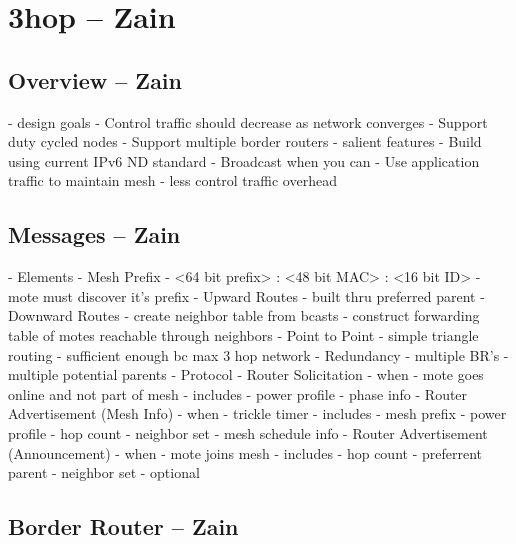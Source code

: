 \section{3hop -- Zain}
\subsection{Overview -- Zain}

- design goals
	- Control traffic should decrease as network converges
	- Support duty cycled nodes
	- Support multiple border routers
- salient features
	- Build using current IPv6 ND standard
	- Broadcast when you can
	- Use application traffic to maintain mesh
	- less control traffic overhead
\subsection{Messages -- Zain}
- Elements
	- Mesh Prefix
		- <64 bit prefix> : <48 bit MAC> : <16 bit ID>
		- mote must discover it's prefix
	- Upward Routes
		- built thru preferred parent
	- Downward Routes
		- create neighbor table from bcasts
		- construct forwarding table of motes reachable through neighbors
	- Point to Point
		- simple triangle routing
		- sufficient enough bc max 3 hop network
	- Redundancy
		- multiple BR's
		- multiple potential parents
- Protocol
	- Router Solicitation
		- when
			- mote goes online and not part of mesh
		- includes
			- power profile
			- phase info
	- Router Advertisement (Mesh Info)
		- when
			- trickle timer
		- includes
			- mesh prefix
			- power profile
			- hop count
			- neighbor set
			- mesh schedule info
	- Router Advertisement (Announcement)
		- when
			- mote joins mesh
		- includes
			- hop count
			- preferrent parent
			- neighbor set
		- optional
\fi

\subsection{Border Router -- Zain}
